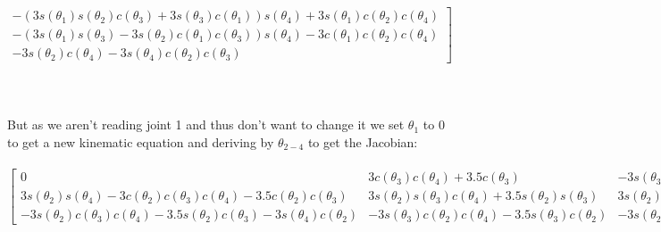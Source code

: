 \documentclass[12pt]{article}
\begin{document}
\begin{landscape}
\\\\\\\\
$\left.\begin{matrix}- \left(3 s{\left(\theta_{1} \right)} s{\left(\theta_{2} \right)} c{\left(\theta_{3} \right)} + 3 s{\left(\theta_{3} \right)} c{\left(\theta_{1} 
\right)}\right) s{\left(\theta_{4} \right)} + 3 s{\left(\theta_{1} \right)} c{\left(\theta_{2} \right)} c{\left(\theta_{4} \right)}\\- \left(3 s{\left(\theta_{1} \right)} s{\left(\theta_{3} \right)} - 3 s{\left(\theta_{2} \right)} c{\left(\theta_{1} \right)} c{\left(\theta_{3} \right)}\right) s{\left(\theta_{4} \right)} - 3 c{\left(\theta_{1} \right)} c{\left(\theta_{2} \right)} c{\left(\theta_{4} \right)}\\- 3 s{\left(\theta_{2} \right)} c{\left(\theta_{4} \right)} - 3 s{\left(\theta_{4} \right)} c{\left(\theta_{2} \right)} c{\left(\theta_{3} \right)}\end{matrix}\right]$\\\\\\\\
But as we aren't reading joint 1 and thus don't want to change it we set $\theta_{1}$ to 0 to get a new kinematic equation and deriving by $\theta_{2 - 4}$ to get the Jacobian:\\\\
$\left[\begin{matrix}0 & 3 c{\left(\theta_{3} \right)} c{\left(\theta_{4} \right)} + 3.5 c{\left(\theta_{3} \right)} & - 3 s{\left(\theta_{3} \right)} s{\left(\theta_{4} \right)}\\3 s{\left(\theta_{2} \right)} s{\left(\theta_{4} \right)} - 3 c{\left(\theta_{2} \right)} c{\left(\theta_{3} \right)} c{\left(\theta_{4} \right)} - 3.5 c{\left(\theta_{2} \right)} c{\left(\theta_{3} \right)} & 3 s{\left(\theta_{2} \right)} s{\left(\theta_{3} \right)} c{\left(\theta_{4} \right)} + 3.5 s{\left(\theta_{2} \right)} s{\left(\theta_{3} \right)} & 3 s{\left(\theta_{2} \right)} s{\left(\theta_{4} \right)} c{\left(\theta_{3} \right)} - 3 c{\left(\theta_{2} \right)} 
c{\left(\theta_{4} \right)}\\- 3 s{\left(\theta_{2} \right)} c{\left(\theta_{3} \right)} c{\left(\theta_{4} \right)} - 3.5 s{\left(\theta_{2} \right)} c{\left(\theta_{3} \right)} - 3 s{\left(\theta_{4} \right)} c{\left(\theta_{2} \right)} & - 3 s{\left(\theta_{3} \right)} c{\left(\theta_{2} \right)} c{\left(\theta_{4} \right)} - 3.5 s{\left(\theta_{3} \right)} c{\left(\theta_{2} \right)} & - 3 s{\left(\theta_{2} \right)} c{\left(\theta_{4} \right)} - 3 s{\left(\theta_{4} \right)} c{\left(\theta_{2} \right)} c{\left(\theta_{3} \right)}\end{matrix}\right]$

\end{landscape}
\end{document}
